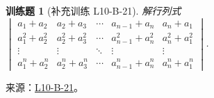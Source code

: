 \documentclass[UTF8,12pt,a4paper,fontset=fandol]{ctexart}
\newtheorem{exercise}{训练题}[section]
\begin{document}
\begin{exercise}[补充训练 L10-B-21]\label{prob:L10-B-21}
解行列式 $\begin{vmatrix}
                a_{1}+a_{2}         & a_{2}+a_{3}         & \cdots & a_{n-1}+a_n         & a_n+a_{1}         \\
                a_{1}^{2}+a_{2}^{2} & a_{2}^{2}+a_{3}^{2} & \cdots & a_{n-1}^{2}+a_n^{2} & a_n^{2}+a_{1}^{2} \\
                \vdots              & \vdots              & \ddots & \vdots              & \vdots            \\
                a_{1}^{n}+a_{2}^{n} & a_{2}^{n}+a_{3}^{n} & \cdots & a_{n-1}^{n}+a_n^{n} & a_n^{n}+a_{1}^{n}
            \end{vmatrix}$.
\end{exercise}
\noindent 来源：\href{https://github.com/yhwu-is/Linear-Algebra-Left-Undone/blob/new/%E8%AE%B2%E4%B9%89/%E4%B8%93%E9%A2%98/10%20%E8%A1%8C%E5%88%97%E5%BC%8F.tex}{L10-B-21}。
\end{document}
